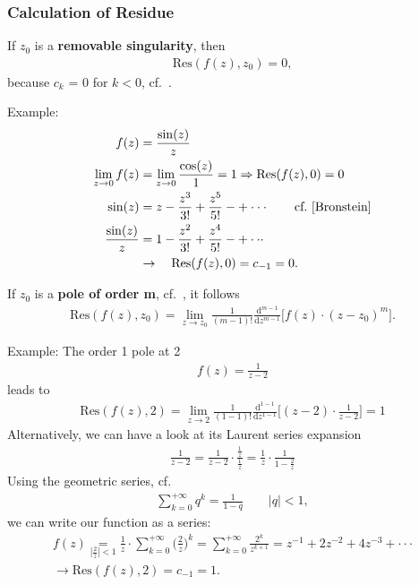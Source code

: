 \subsubsection{Calculation of Residue}
If $z_0$ is a \textbf{removable singularity}, then
\begin{align}
	\mathrm{Res}(f(z),z_0)=0,
\end{align}
because $c_k$ = 0 for $k<0$, cf.~\cite{Fritzsche2019}.

\noindent Example:
\begin{align}
	f(z) &= \frac{\sin(z)}{z} \nonumber \\
	\lim\limits_{z \rightarrow 0}f(z) &= \lim\limits_{z \rightarrow 0}\frac{\cos(z)}{1}=1 \Rightarrow \mathrm{Res}(f(z),0)=0 \nonumber \\
	\sin(z) &= z-\frac{z^3}{3!}+\frac{z^5}{5!}-+\cdot\cdot\cdot\quad \quad \textrm{cf.~\cite{Bronstein}} \nonumber \\
	\frac{\sin(z)}{z} &= 1 - \frac{z^2}{3!}+\frac{z^4}{5!}-+\cdot\cdot\cdot \nonumber \\
	&\rightarrow \quad \mathrm{Res}(f(z),0)=c_{-1} = 0. \nonumber
\end{align}

If $z_0$ is a \textbf{pole of order m}, cf.~\cite{Fritzsche2019}, it follows
\begin{align}
\label{eq:ResTheorem_pole_order_m}
	\mathrm{Res}(f(z),z_0)=\lim\limits_{z \rightarrow z_0}\frac{1}{(m-1)!}\frac{\mathrm{d}^{m-1}}{\mathrm{d} z^{m-1}}\bigg [f(z)\cdot (z-z_0)^m\bigg ].
\end{align}

\noindent Example: The order 1 pole at 2
\begin{align}
	f(z) = \frac{1}{z-2} \nonumber
\end{align}
leads to
\begin{align}
	\mathrm{Res}(f(z),2)=\lim\limits_{z\rightarrow 2}\frac{1}{(1-1)!}\frac{\mathrm{d}^{1-1}}{\mathrm{d}z^{1-1}}\bigg [(z-2)\cdot\frac{1}{z-2}\bigg ] = 1 \nonumber
\end{align}
Alternatively, we can have a look at its Laurent series expansion
\begin{align}
	\frac{1}{z-2}=\frac{1}{z-2}\cdot\frac{\frac{1}{z}}{\frac{1}{z}}=\frac{1}{z}\cdot\frac{1}{1-\frac{2}{z}} \nonumber
\end{align}
Using the geometric series, cf.~\cite{Bronstein}
\begin{align}
	\sum_{k=0}^{+\infty}q^k=\frac{1}{1-q}\quad\quad|q| < 1 \nonumber,
\end{align}
we can write our function as a series:
\begin{align}
	f(z)\underset{|\frac{2}{z}|<1}{=}\frac{1}{z}\cdot\sum_{k=0}^{+\infty}\bigg (\frac{2}{z}\bigg )^k = \sum_{k=0}^{+\infty}\frac{2^k}{z^{k+1}} = z^{-1}+2z^{-2}+4z^{-3}+\cdot\cdot\cdot \nonumber \\
	\rightarrow \mathrm{Res}(f(z),2)=c_{-1}=1. \nonumber
\end{align}

